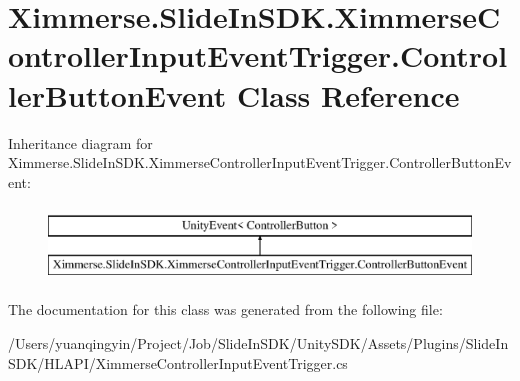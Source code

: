 \hypertarget{class_ximmerse_1_1_slide_in_s_d_k_1_1_ximmerse_controller_input_event_trigger_1_1_controller_button_event}{}\section{Ximmerse.\+Slide\+In\+S\+D\+K.\+Ximmerse\+Controller\+Input\+Event\+Trigger.\+Controller\+Button\+Event Class Reference}
\label{class_ximmerse_1_1_slide_in_s_d_k_1_1_ximmerse_controller_input_event_trigger_1_1_controller_button_event}
Inheritance diagram for Ximmerse.\+Slide\+In\+S\+D\+K.\+Ximmerse\+Controller\+Input\+Event\+Trigger.\+Controller\+Button\+Event\+:\begin{figure}[H]
\begin{center}
\leavevmode
\includegraphics[height=2.000000cm]{class_ximmerse_1_1_slide_in_s_d_k_1_1_ximmerse_controller_input_event_trigger_1_1_controller_button_event}
\end{center}
\end{figure}


The documentation for this class was generated from the following file\+:\begin{DoxyCompactItemize}
\item 
/\+Users/yuanqingyin/\+Project/\+Job/\+Slide\+In\+S\+D\+K/\+Unity\+S\+D\+K/\+Assets/\+Plugins/\+Slide\+In\+S\+D\+K/\+H\+L\+A\+P\+I/Ximmerse\+Controller\+Input\+Event\+Trigger.\+cs\end{DoxyCompactItemize}

